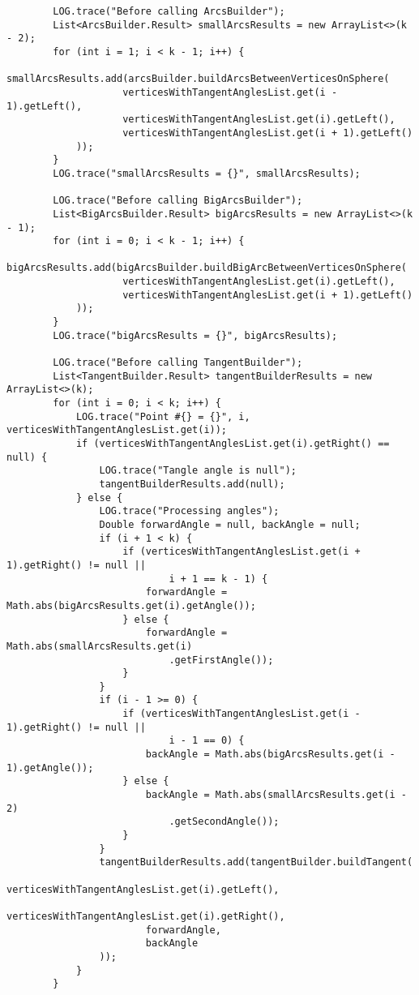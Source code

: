 \begin{verbatim}
        LOG.trace("Before calling ArcsBuilder");
        List<ArcsBuilder.Result> smallArcsResults = new ArrayList<>(k - 2);
        for (int i = 1; i < k - 1; i++) {
            smallArcsResults.add(arcsBuilder.buildArcsBetweenVerticesOnSphere(
                    verticesWithTangentAnglesList.get(i - 1).getLeft(),
                    verticesWithTangentAnglesList.get(i).getLeft(),
                    verticesWithTangentAnglesList.get(i + 1).getLeft()
            ));
        }
        LOG.trace("smallArcsResults = {}", smallArcsResults);

        LOG.trace("Before calling BigArcsBuilder");
        List<BigArcsBuilder.Result> bigArcsResults = new ArrayList<>(k - 1);
        for (int i = 0; i < k - 1; i++) {
            bigArcsResults.add(bigArcsBuilder.buildBigArcBetweenVerticesOnSphere(
                    verticesWithTangentAnglesList.get(i).getLeft(),
                    verticesWithTangentAnglesList.get(i + 1).getLeft()
            ));
        }
        LOG.trace("bigArcsResults = {}", bigArcsResults);

        LOG.trace("Before calling TangentBuilder");
        List<TangentBuilder.Result> tangentBuilderResults = new ArrayList<>(k);
        for (int i = 0; i < k; i++) {
            LOG.trace("Point #{} = {}", i, verticesWithTangentAnglesList.get(i));
            if (verticesWithTangentAnglesList.get(i).getRight() == null) {
                LOG.trace("Tangle angle is null");
                tangentBuilderResults.add(null);
            } else {
                LOG.trace("Processing angles");
                Double forwardAngle = null, backAngle = null;
                if (i + 1 < k) {
                    if (verticesWithTangentAnglesList.get(i + 1).getRight() != null ||
                            i + 1 == k - 1) {
                        forwardAngle = Math.abs(bigArcsResults.get(i).getAngle());
                    } else {
                        forwardAngle = Math.abs(smallArcsResults.get(i)
                            .getFirstAngle());
                    }
                }
                if (i - 1 >= 0) {
                    if (verticesWithTangentAnglesList.get(i - 1).getRight() != null ||
                            i - 1 == 0) {
                        backAngle = Math.abs(bigArcsResults.get(i - 1).getAngle());
                    } else {
                        backAngle = Math.abs(smallArcsResults.get(i - 2)
                            .getSecondAngle());
                    }
                }
                tangentBuilderResults.add(tangentBuilder.buildTangent(
                        verticesWithTangentAnglesList.get(i).getLeft(),
                        verticesWithTangentAnglesList.get(i).getRight(),
                        forwardAngle,
                        backAngle
                ));
            }
        }


\end{verbatim}
